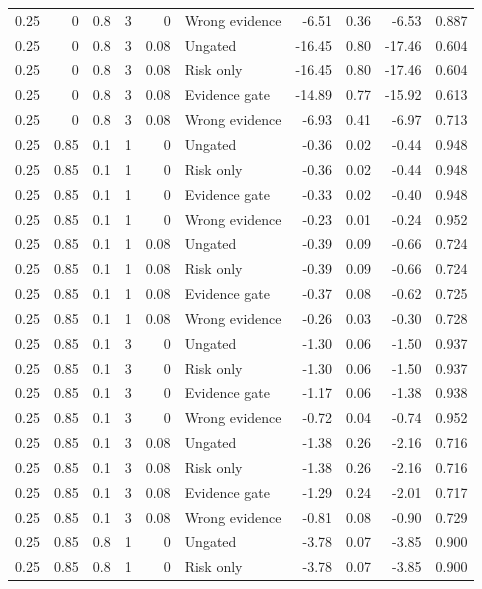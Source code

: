 \begin{longtable}{rrrrrlrrrr}
0.25 & 0 & 0.8 & 3 & 0 & Wrong evidence & -6.51 & 0.36 & -6.53 & 0.887\\
0.25 & 0 & 0.8 & 3 & 0.08 & Ungated & -16.45 & 0.80 & -17.46 & 0.604\\
0.25 & 0 & 0.8 & 3 & 0.08 & Risk only & -16.45 & 0.80 & -17.46 & 0.604\\
0.25 & 0 & 0.8 & 3 & 0.08 & Evidence gate & -14.89 & 0.77 & -15.92 & 0.613\\
0.25 & 0 & 0.8 & 3 & 0.08 & Wrong evidence & -6.93 & 0.41 & -6.97 & 0.713\\
0.25 & 0.85 & 0.1 & 1 & 0 & Ungated & -0.36 & 0.02 & -0.44 & 0.948\\
0.25 & 0.85 & 0.1 & 1 & 0 & Risk only & -0.36 & 0.02 & -0.44 & 0.948\\
0.25 & 0.85 & 0.1 & 1 & 0 & Evidence gate & -0.33 & 0.02 & -0.40 & 0.948\\
0.25 & 0.85 & 0.1 & 1 & 0 & Wrong evidence & -0.23 & 0.01 & -0.24 & 0.952\\
0.25 & 0.85 & 0.1 & 1 & 0.08 & Ungated & -0.39 & 0.09 & -0.66 & 0.724\\
0.25 & 0.85 & 0.1 & 1 & 0.08 & Risk only & -0.39 & 0.09 & -0.66 & 0.724\\
0.25 & 0.85 & 0.1 & 1 & 0.08 & Evidence gate & -0.37 & 0.08 & -0.62 & 0.725\\
0.25 & 0.85 & 0.1 & 1 & 0.08 & Wrong evidence & -0.26 & 0.03 & -0.30 & 0.728\\
0.25 & 0.85 & 0.1 & 3 & 0 & Ungated & -1.30 & 0.06 & -1.50 & 0.937\\
0.25 & 0.85 & 0.1 & 3 & 0 & Risk only & -1.30 & 0.06 & -1.50 & 0.937\\
0.25 & 0.85 & 0.1 & 3 & 0 & Evidence gate & -1.17 & 0.06 & -1.38 & 0.938\\
0.25 & 0.85 & 0.1 & 3 & 0 & Wrong evidence & -0.72 & 0.04 & -0.74 & 0.952\\
0.25 & 0.85 & 0.1 & 3 & 0.08 & Ungated & -1.38 & 0.26 & -2.16 & 0.716\\
0.25 & 0.85 & 0.1 & 3 & 0.08 & Risk only & -1.38 & 0.26 & -2.16 & 0.716\\
0.25 & 0.85 & 0.1 & 3 & 0.08 & Evidence gate & -1.29 & 0.24 & -2.01 & 0.717\\
0.25 & 0.85 & 0.1 & 3 & 0.08 & Wrong evidence & -0.81 & 0.08 & -0.90 & 0.729\\
0.25 & 0.85 & 0.8 & 1 & 0 & Ungated & -3.78 & 0.07 & -3.85 & 0.900\\
0.25 & 0.85 & 0.8 & 1 & 0 & Risk only & -3.78 & 0.07 & -3.85 & 0.900\\

\end{longtable}
